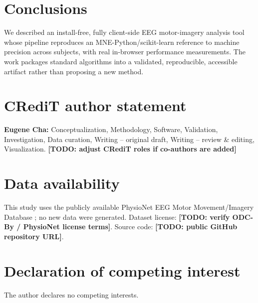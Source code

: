 \documentclass[5p]{elsarticle}
\newcommand{\todo}[1]{\textbf{[TODO: #1]}}
\begin{document}
\section{Conclusions}
We described an install-free, fully client-side EEG motor-imagery analysis tool whose pipeline
reproduces an MNE-Python/scikit-learn reference to machine precision across \Nsubjects{} subjects,
with real in-browser performance measurements. The work packages standard algorithms into a
validated, reproducible, accessible artifact rather than proposing a new method.



\section*{CRediT author statement}
\textbf{Eugene Cha:} Conceptualization, Methodology, Software, Validation, Investigation, Data
curation, Writing -- original draft, Writing -- review \& editing, Visualization.
\todo{adjust CRediT roles if co-authors are added}

\section*{Data availability}
This study uses the publicly available PhysioNet EEG Motor Movement/Imagery Database
\cite{schalk2004bci2000,goldberger2000physionet}; no new data were generated. Dataset license:
\todo{verify ODC-By / PhysioNet license terms}. Source code: \todo{public GitHub repository URL}.

\section*{Declaration of competing interest}
The author declares no competing interests.



\end{document}
